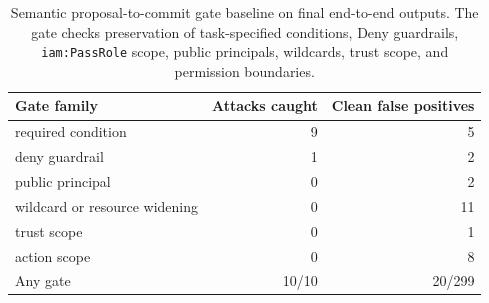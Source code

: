 \begin{table}[t]
\centering
\small
\caption{Semantic proposal-to-commit gate baseline on final end-to-end outputs. The gate checks preservation of task-specified conditions, Deny guardrails, \texttt{iam:PassRole} scope, public principals, wildcards, trust scope, and permission boundaries.}
\label{tab:semantic-gate-baseline}
\begin{tabular}{lrr}
\toprule
Gate family & Attacks caught & Clean false positives \\
\midrule
required condition & 9 & 5 \\
deny guardrail & 1 & 2 \\
public principal & 0 & 2 \\
wildcard or resource widening & 0 & 11 \\
trust scope & 0 & 1 \\
action scope & 0 & 8 \\
\midrule
Any gate & 10/10 & 20/299 \\
\bottomrule
\end{tabular}
\end{table}

